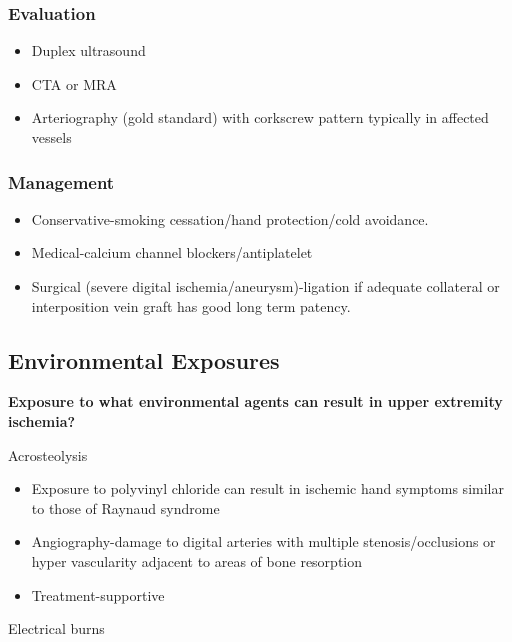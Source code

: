 \documentclass[
]{book}
\begin{document}
\hypertarget{evaluation-5}{%
\subsubsection{Evaluation}\label{evaluation-5}}

\begin{itemize}
\item
  Duplex ultrasound
\item
  CTA or MRA
\item
  Arteriography (gold standard) with corkscrew pattern typically in
  affected vessels
\end{itemize}

\hypertarget{management-6}{%
\subsubsection{Management}\label{management-6}}

\begin{itemize}
\item
  Conservative-smoking cessation/hand protection/cold
  avoidance.\citep{carr2019}
\item
  Medical-calcium channel blockers/antiplatelet
\item
  Surgical (severe digital ischemia/aneurysm)-ligation if adequate
  collateral or interposition vein graft has good long term patency.
\end{itemize}

\hypertarget{environmental-exposures}{%
\subsection{Environmental Exposures}\label{environmental-exposures}}

\textbf{Exposure to what environmental agents can result in upper extremity
ischemia?}

Acrosteolysis

\begin{itemize}
\item
  Exposure to polyvinyl chloride can result in ischemic hand symptoms
  similar to those of Raynaud syndrome
\item
  Angiography-damage to digital arteries with multiple
  stenosis/occlusions or hyper vascularity adjacent to areas of bone
  resorption
\item
  Treatment-supportive
\end{itemize}

Electrical burns
\end{document}

